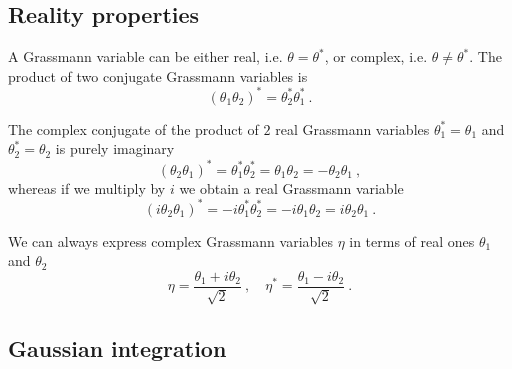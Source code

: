 \subsection{Reality properties}

    A Grassmann variable can be either real, i.e. $\theta = \theta^*$, or complex, i.e. $\theta \neq \theta^*$. The product of two conjugate Grassmann variables is 
    \begin{equation*}
        (\theta_1 \theta_2)^* = \theta_2^* \theta_1^* ~.
    \end{equation*}

    The complex conjugate of the product of $2$ real Grassmann variables $\theta_1^* = \theta_1$ and $\theta_2^* = \theta_2$ is purely imaginary 
    \begin{equation*}
        (\theta_2 \theta_1)^* = \theta_1^* \theta_2^* = \theta_1 \theta_2 = - \theta_2 \theta_1 ~,
    \end{equation*}
    whereas if we multiply by $i$ we obtain a real Grassmann variable 
    \begin{equation*}
        (i \theta_2 \theta_1)^* = - i\theta_1^* \theta_2^* = - i \theta_1 \theta_2 = i \theta_2 \theta_1 ~.
    \end{equation*}

    We can always express complex Grassmann variables $\eta$ in terms of real ones $\theta_1$ and $\theta_2$
    \begin{equation*}
        \eta = \frac{\theta_1 + i \theta_2}{\sqrt 2} ~, \quad \eta^* = \frac{\theta_1 - i \theta_2}{\sqrt 2} ~.
    \end{equation*}

\subsection{Gaussian integration}

